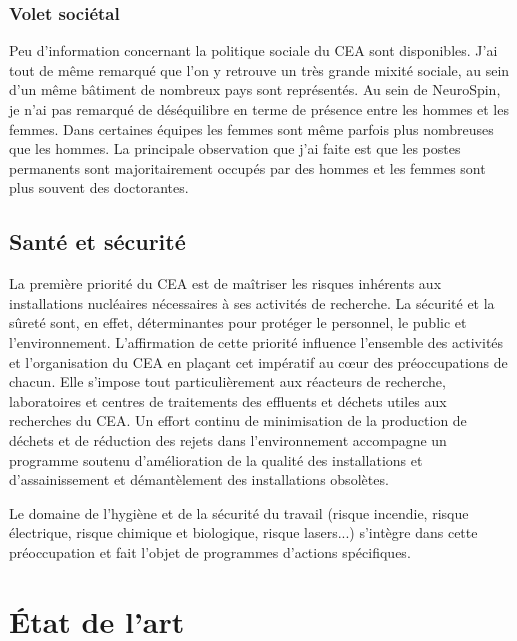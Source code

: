 \documentclass[12pt, oneside, a4paper, titlepage]{article}
\begin{document}
\subsubsection*{Volet sociétal}
Peu d’information concernant la politique sociale du CEA sont disponibles. J’ai tout de même remarqué que l’on y retrouve un très grande mixité sociale, au sein d’un même bâtiment de nombreux pays sont représentés. Au sein de NeuroSpin, je n’ai pas remarqué de déséquilibre en terme de présence entre les hommes et les femmes. Dans certaines équipes les femmes sont même parfois plus nombreuses que les hommes. La principale observation que j’ai faite est que les postes permanents sont majoritairement occupés par des hommes et les femmes sont plus souvent des doctorantes. 


\vspace{5mm} 

\subsection{Santé et sécurité}

\vspace{5mm} 

La première priorité du CEA est de maîtriser les risques inhérents aux installations nucléaires nécessaires à ses activités de recherche. La sécurité et la sûreté sont, en effet, déterminantes pour protéger le personnel, le public et l'environnement.  
L'affirmation de cette priorité influence l'ensemble des activités et l'organisation du CEA en plaçant cet impératif au cœur des préoccupations de chacun. Elle s'impose tout particulièrement aux réacteurs de recherche, laboratoires et centres de traitements des effluents et déchets utiles aux recherches du CEA. Un effort continu de minimisation de la production de déchets et de réduction des rejets dans l'environnement accompagne un programme soutenu d'amélioration de la qualité des installations et d'assainissement et démantèlement des installations obsolètes.

\vspace{5mm} 

Le domaine de l'hygiène et de la sécurité du travail (risque incendie, risque électrique, risque chimique et biologique, risque lasers...) s'intègre dans cette préoccupation et fait l'objet de programmes d'actions spécifiques.


\newpage


\section{État de l’art}
\end{document}
